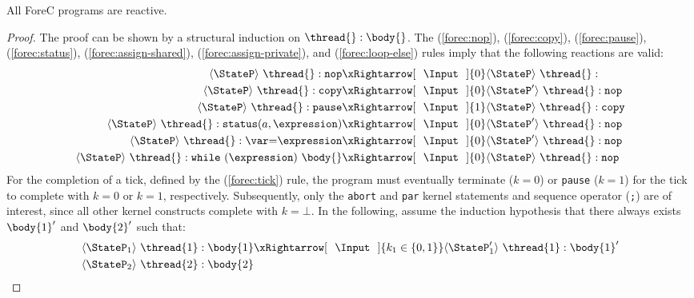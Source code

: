 \begin{theorem}
	\label{thm:reactive}
	All ForeC programs are reactive.
\end{theorem}
\begin{proof}
	The proof can be shown by a structural induction on $\thread{}:\body{}$.
	The (\ref{forec:nop}), (\ref{forec:copy}), (\ref{forec:pause}), (\ref{forec:status}),
	(\ref{forec:assign-shared}), (\ref{forec:assign-private}), and (\ref{forec:loop-else})
	rules imply that the following reactions are valid:
	\begin{align*}
		\langle \StateP \rangle ~ \thread{}:\mathtt{nop}
		&	\xRightarrow[~~\Input~~]{0} 
		\langle \StateP \rangle ~ \thread{}:									\\
		\langle \StateP \rangle ~ \thread{}:\mathtt{copy}
		&	\xRightarrow[~~\Input~~]{0} 
		\langle \StateP' \rangle ~ \thread{}:\mathtt{nop}						\\
		\langle \StateP \rangle ~ \thread{}:\mathtt{pause}
		&	\xRightarrow[~~\Input~~]{1} 
		\langle \StateP \rangle ~ \thread{}:\mathtt{copy}						\\
		\langle \StateP \rangle ~ \thread{}:\mathtt{status}(a, \expression)
		&	\xRightarrow[~~\Input~~]{0} 
		\langle \StateP' \rangle ~ \thread{}:\mathtt{nop}						\\
		\langle \StateP \rangle ~ \thread{}:\var \mathtt{=} \expression
		&	\xRightarrow[~~\Input~~]{0} 
		\langle \StateP' \rangle ~ \thread{}:\mathtt{nop}						\\
		\langle \StateP \rangle ~ \thread{}:\mathtt{while}~(\expression)~\body{}
		&	\xRightarrow[~~\Input~~]{0} 
		\langle \StateP \rangle ~ \thread{}:\mathtt{nop}
	\end{align*}
	For the completion of a tick, defined by the (\ref{forec:tick})
	rule, the program must eventually terminate 
	($k = 0$) or \verb$pause$ ($k = 1$) for the tick to complete with 
	$k = 0$ or $k = 1$, respectively.
	Subsequently, only the \verb$abort$ and \verb$par$ kernel
	statements and sequence operator (\verb$;$) are of interest, 
	since all other kernel constructs complete with $k = \bot$.
	In the following, assume the induction hypothesis that there 
	always exists $\body{1}'$ and $\body{2}'$ such that:
	\begin{align}
		\label{eq:proofs_hypothesis1}
		\langle \StateP_1 \rangle ~ \thread{1}:\body{1}
		&	\xRightarrow[~~\Input~~]{k_1 \in \{0, 1\}} 
		\langle \StateP_1' \rangle ~ \thread{1}:\body{1}'						\\
		\label{eq:proofs_hypothesis2}
		\langle \StateP_2 \rangle ~ \thread{2}:\body{2}

\end{align}
\end{proof}
